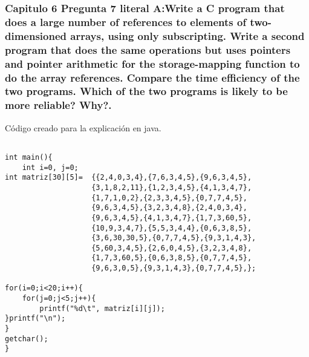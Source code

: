 \subsubsection{Capitulo 6 Pregunta 7 literal A:Write a C program that does a large number of references to elements
of two-dimensioned arrays, using only subscripting. Write a second
program that does the same operations but uses pointers and pointer
arithmetic for the storage-mapping function to do the array references.
Compare the time efficiency of the two programs. Which of the two
programs is likely to be more reliable? Why?.}

\lstset{language = java}  %
Código creado para la explicación en java.
\begin{lstlisting}[frame = single] %Comienzo del Código

int main(){
    int i=0, j=0;
int matriz[30][5]=  {{2,4,0,3,4},{7,6,3,4,5},{9,6,3,4,5},
                    {3,1,8,2,11},{1,2,3,4,5},{4,1,3,4,7},
                    {1,7,1,0,2},{2,3,3,4,5},{0,7,7,4,5},
                    {9,6,3,4,5},{3,2,3,4,8},{2,4,0,3,4},
                    {9,6,3,4,5},{4,1,3,4,7},{1,7,3,60,5},
                    {10,9,3,4,7},{5,5,3,4,4},{0,6,3,8,5},
                    {3,6,30,30,5},{0,7,7,4,5},{9,3,1,4,3},
                    {5,60,3,4,5},{2,6,0,4,5},{3,2,3,4,8},
                    {1,7,3,60,5},{0,6,3,8,5},{0,7,7,4,5},
                    {9,6,3,0,5},{9,3,1,4,3},{0,7,7,4,5},};

for(i=0;i<20;i++){
    for(j=0;j<5;j++){
        printf("%d\t", matriz[i][j]);
}printf("\n");
}
getchar();
}


\end{lstlisting}



